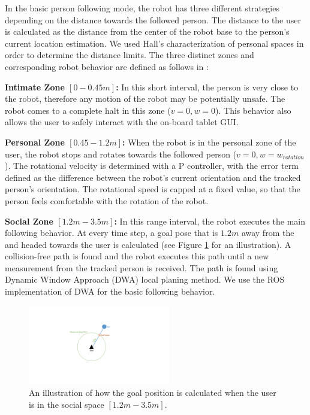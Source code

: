 In the basic person following mode, the robot has three different strategies depending on the distance towards the followed person. The distance to the user is calculated as the distance from the center of the robot base to the person's current location estimation. We used Hall's characterization of personal spaces in order to determine the distance limits. The three distinct zones and corresponding robot behavior are defined as follows in \cite{hall1969hidden}:

\textbf{Intimate Zone $[0-0.45m]$:} In this short interval, the person is very close to the robot, therefore any motion of the robot may be potentially unsafe. The robot comes to a complete halt in this zone ($v=0,w=0$). This behavior also allows the user to safely interact with the on-board tablet GUI.

\textbf{Personal Zone $[0.45-1.2m]$:} When the robot is in the personal zone of the user, the robot stops and rotates towards the followed person ($v=0,w=w_{rotation}$). The rotational velocity is determined with a P controller, with the error term defined as the difference between the robot's current orientation and the tracked person's orientation. The rotational speed is capped at a fixed value, so that the person feels comfortable with the rotation of the robot.

\textbf{Social Zone $[1.2m-3.5m]$: } In this range interval, the robot executes the main following behavior. At every time step, a goal pose that is $1.2m$ away from the and headed towards the user is calculated (see Figure \ref{fig:following_1m} for an illustration). A collision-free path is found and the robot executes this path until a new measurement from the tracked person is received. The path is found using Dynamic Window Approach (DWA) local planing method. We use the ROS implementation of DWA for the basic following behavior.

\begin{figure}[h!]
\centering
\includegraphics[width=0.55\textwidth]{pics/following_1m_cropped}
\caption{An illustration of how the goal position is calculated when the user is in the social space $[1.2m-3.5m]$.}
\label{fig:following_1m}
\end{figure}

